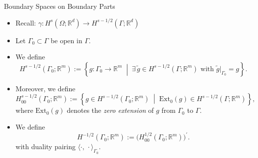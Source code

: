 \documentclass[10pt,aspectratio=169]{beamer}
\def\R{{\mathbb R}}
\begin{document}
\begin{frame}{Boundary Spaces on Boundary Parts}
	\begin{itemize}
		\item Recall: $\gamma: H^s(\Omega;\R^d)\to H^{s-1/2}(\Gamma;\R^d)$
		\item Let $\Gamma_0\subset\Gamma$ be open in $\Gamma$.
		\item We define
		      \begin{equation*}
			      H^{s-1/2}(\Gamma_0;\R^m)
			      :=
			      \left\{g:\Gamma_0\to \R^m\;\middle|\;\exists\,\widetilde g\in H^{s-1/2}(\Gamma;\R^m)\text{ with }\widetilde g|_{\Gamma_0}=g\right\}.
		      \end{equation*}
		\item Moreover, we define
		      \begin{equation*}
			      H^{s-1/2}_{00}(\Gamma_0;\R^m)
			      :=
			      \left\{g\in H^{s-1/2}(\Gamma_0;\R^m)\;\middle|\;\mathrm{Ext}_0(g)\in H^{s-1/2}(\Gamma;\R^m)\right\},
		      \end{equation*}
		      where $\mathrm{Ext}_0(g)$ denotes the {\em zero extension} of $g$ from $\Gamma_0$ to $\Gamma$.
		\item We define
		      \begin{equation*}
			      H^{-1/2}(\Gamma_0;\R^m):=\big(H^{1/2}_{00}(\Gamma_0;\R^m)\big)^\prime.
		      \end{equation*}
		      with duality pairing $\langle\cdot,\,\cdot\rangle_{\Gamma_0}$.
	\end{itemize}
\end{frame}
\end{document}
